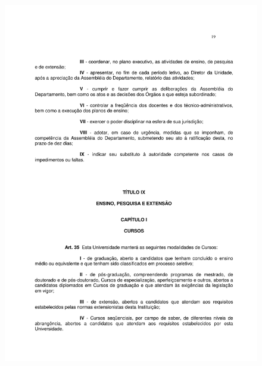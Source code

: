 \begin{figure}[p]
	\centering 
	\includegraphics[scale=0.7]{capitulos/resolucoes/cuni414/cuni414-19.pdf}
\end{figure}

